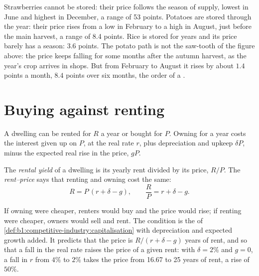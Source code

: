 Strawberries cannot be stored: their price follows the season of supply,
lowest in June and highest in December, a range of 53 points. Potatoes are
stored through the year: their price rises from a low in February to a
high in August, just before the main harvest, a range of 8.4 points.
Rice is stored for years and its price barely has a season: 3.6 points.
The potato path is not the saw-tooth of the figure above: the price keeps
falling for some months after the autumn harvest, as the year's crop
arrives in shops. But from February to August it rises by about $1.4$ points
a month, $8.4$ points over six months, the order of a .

\section{Buying against renting}\label{sec:b1:price-theory-at-work:buy-rent}

A dwelling can be rented for $R$ a year or bought for $P$. Owning for a year
costs the interest given up on $P$, at the real rate $r$, plus depreciation
and upkeep $\delta P$, minus the expected real rise in the price, $gP$.

\begin{definition}\label{def:b1:price-theory-at-work:rental-yield}
The \emph{rental yield} of a dwelling is its yearly rent divided by its
price, $R/P$. The \emph{rent--price } says that renting and
owning cost the same:
\[
R = P\,(r + \delta - g), \qquad \frac RP = r + \delta - g.
\]
\end{definition}

If owning were cheaper, renters would buy and the price would rise; if
renting were cheaper, owners would sell and rent. The condition is the
 of \cref{def:b1:competitive-industry:capitalisation} with
depreciation and expected growth added. It predicts that the price is
$R/(r + \delta - g)$ years of rent, and so that a fall in the real rate raises
the price of a given rent: with $\delta = 2\%$ and $g = 0$, a fall in $r$ from $4\%$ to
$2\%$ takes the price from 16.67 to 25 years of rent, a rise of $50\%$.

